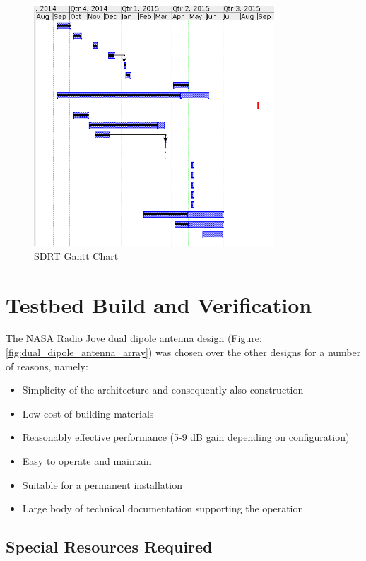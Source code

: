 \documentclass[runningheads,a4paper]{llncs}
\begin{document}
%
\begin{figure}[here]
	\centering
	\includegraphics[width=9cm]{images/57}
	\caption{SDRT Gantt Chart}
	\label{fig:sdrt-gantt}
\end{figure}
%

%
%
\newpage
\chapter*{Testbed Build and Verification}
The NASA Radio Jove dual dipole antenna design (Figure: \ref{fig:dual_dipole_antenna_array}) was chosen over the other designs for a number of reasons, namely:

\begin{itemize}
	\item Simplicity of the architecture and consequently also construction
	\item Low cost of building materials
	\item Reasonably effective performance (5-9 dB gain depending on configuration)
	\item Easy to operate and maintain
	\item Suitable for a permanent installation
	\item Large body of technical documentation supporting the operation
\end{itemize}


\section*{Special Resources Required}
\end{document}
